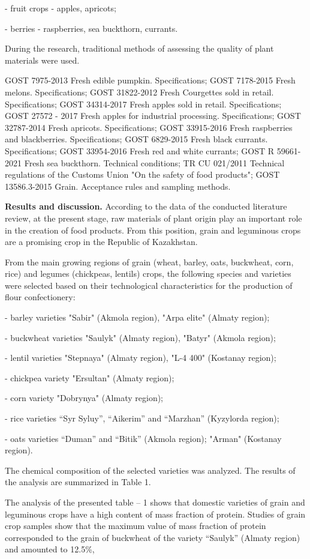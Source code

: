 \begin{multicols}{2}
- fruit crops - apples, apricots;

- berries - raspberries, sea buckthorn, currants.

During the research, traditional methods of assessing the quality of
plant materials were used.

GOST 7975-2013 Fresh edible pumpkin. Specifications; GOST 7178-2015
Fresh melons. Specifications; GOST 31822-2012 Fresh Courgettes sold in
retail. Specifications; GOST 34314-2017 Fresh apples sold in retail.
Specifications; GOST 27572 - 2017 Fresh apples for industrial
processing. Specifications; GOST 32787-2014 Fresh apricots.
Specifications; GOST 33915-2016 Fresh raspberries and blackberries.
Specifications; GOST 6829-2015 Fresh black currants. Specifications;
GOST 33954-2016 Fresh red and white currants; GOST R 59661-2021 Fresh
sea buckthorn. Technical conditions; TR CU 021/2011 Technical
regulations of the Customs Union "On the safety of food products"; GOST
13586.3-2015 Grain. Acceptance rules and sampling methods.

{\bfseries Results and discussion.} According to the data of the conducted
literature review, at the present stage, raw materials of plant origin
play an important role in the creation of food products. From this
position, grain and leguminous crops are a promising crop in the
Republic of Kazakhstan.

From the main growing regions of grain (wheat, barley, oats, buckwheat,
corn, rice) and legumes (chickpeas, lentils) crops, the following
species and varieties were selected based on their technological
characteristics for the production of flour confectionery:

- barley varieties "Sabir" (Akmola region), "Arpa elite" (Almaty
region);

- buckwheat varieties "Saulyk" (Almaty region), "Batyr" (Akmola region);

- lentil varieties "Stepnaya" (Almaty region), "L-4 400" (Kostanay
region);

- chickpea variety "Ersultan" (Almaty region);

- corn variety "Dobrynya" (Almaty region);

- rice varieties ``Syr Syluy'', ``Aikerim'' and ``Marzhan'' (Kyzylorda
region);

- oats varieties ``Duman'' and ``Bitik'' (Akmola region); "Arman"
(Kostanay region).

The chemical composition of the selected varieties was analyzed. The
results of the analysis are summarized in Table 1.

The analysis of the presented table -- 1 shows that domestic varieties
of grain and leguminous crops have a high content of mass fraction of
protein. Studies of grain crop samples show that the maximum value of
mass fraction of protein corresponded to the grain of buckwheat of the
variety ``Saulyk'' (Almaty region) and amounted to 12.5\%,
\end{multicols}

